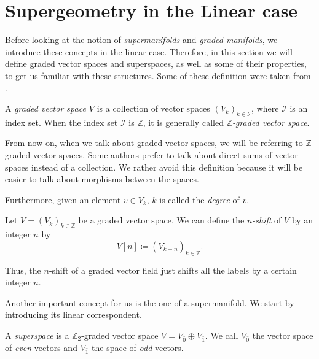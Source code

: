 \section{Supergeometry in the Linear case}
\label{sec:Linear_case}

Before looking at the notion of \emph{supermanifolds} and \emph{graded manifolds}, we introduce these concepts in the linear case.
Therefore, in this section we will define graded vector spaces and superspaces, as well as some of their properties, to get us familiar with these structures.
Some of these definition were taken from \cite{Binda}.

\begin{definition}
    A \emph{graded vector space $V$} is a collection of vector spaces $(V_k)_{k \in \mathcal{I}}$, where $\mathcal{I}$ is an index set.
    When the index set $\mathcal{I}$ is $\mathbb{Z}$, it is generally called \emph{$\mathbb{Z}$-graded vector space}.
\end{definition}

From now on, when we talk about graded vector spaces, we will be referring to $\mathbb{Z}$-graded vector spaces.
Some authors prefer to talk about direct sums of vector spaces instead of a collection.
We rather avoid this definition because it will be easier to talk about morphisms between the spaces.

Furthermore, given an element $v \in V_k$, $k$ is called the \emph{degree} of $v$.

\begin{definition}
    Let $V = (V_k)_{k \in \mathbb{Z}}$ be a graded vector space.
    We can define the \emph{$n$-shift} of $V$ by an integer $n$ by
    \begin{equation*}
        V[n] \coloneqq (V_{k + n})_{k \in \mathbb{Z}} .
    \end{equation*}
\end{definition}
Thus, the $n$-shift of a graded vector field just shifts all the labels by a certain integer $n$.

Another important concept for us is the one of a supermanifold.
We start by introducing its linear correspondent.

\begin{definition}
    A \emph{superspace} is a $\mathbb{Z}_2$-graded vector space $V = V_{\bar{0}} \oplus V_{\bar{1}}$.
    We call $V_{\bar{0}}$ the vector space of \emph{even} vectors and $V_{\bar{1}}$ the space of \emph{odd} vectors.
\end{definition}

